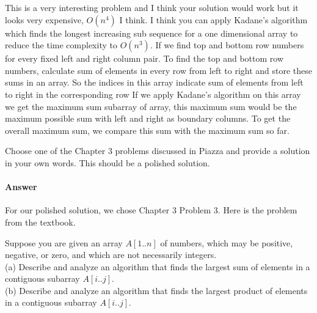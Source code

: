 \documentclass{article}
\begin{document}
\begin{enumerate}
        This is a very interesting problem and I think your solution would work but it looks very expensive, $O(n^4)$ I think. I think you can apply Kadane’s algorithm which finds the longest increasing sub sequence for a one dimensional array to reduce the time complexity to $O(n^3)$. If we find top and bottom row numbers for every fixed left and right column pair. To find the top and bottom row numbers, calculate sum of elements in every row from left to right and store these sums in an array. So the indices in this array indicate sum of elements from left to right in the corresponding row If we apply Kadane’s algorithm on this array we get the maximum sum subarray of array, this maximum sum would be the maximum possible sum with left and right as boundary columns. To get the overall maximum sum, we compare this sum with the maximum sum so far.

\end{enumerate}


\nextprob
{}

Choose one of the Chapter 3 problems discussed in Piazza and provide a solution
in your own words.  This should be a polished solution.

\paragraph{Answer}

For our polished solution, we chose Chapter 3 Problem 3.
Here is the problem from the textbook.

Suppose you are given an array $A[1 .. n]$ of numbers, which may be positive, negative, or zero, and which are not necessarily integers. \\
(a) Describe and analyze an algorithm that finds the largest sum of elements in a contiguous subarray $A[i .. j]$. \\
(b) Describe and analyze an algorithm that finds the largest product of elements in a contiguous subarray $A[i .. j]$.
\end{document}

